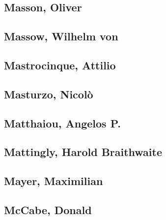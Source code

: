 \subsection[Masson, Oliver (2)]{Masson, Oliver}


\subsection[Massow, Wilhelm von (1)]{Massow, Wilhelm von}

\subsection[Mastrocinque, Attilio (2)]{Mastrocinque, Attilio}


\subsection[Masturzo, Nicolò (1)]{Masturzo, Nicolò}

\subsection[Matthaiou, Angelos P. (1)]{Matthaiou, Angelos P.}

\subsection[Mattingly, Harold Braithwaite (1)]{Mattingly, Harold Braithwaite}

\subsection[Mayer, Maximilian (1)]{Mayer, Maximilian}

\subsection[McCabe, Donald (1)]{McCabe, Donald}

